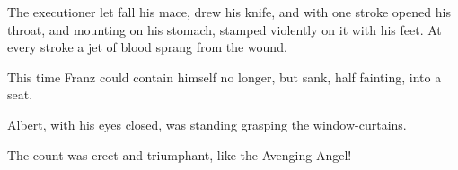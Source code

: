 The executioner let fall his mace, drew his knife, and with one stroke
opened his throat, and mounting on his stomach, stamped violently on it
with his feet. At every stroke a jet of blood sprang from the wound.

This time Franz could contain himself no longer, but sank, half
fainting, into a seat.

Albert, with his eyes closed, was standing grasping the
window-curtains.

The count was erect and triumphant, like the Avenging Angel!
